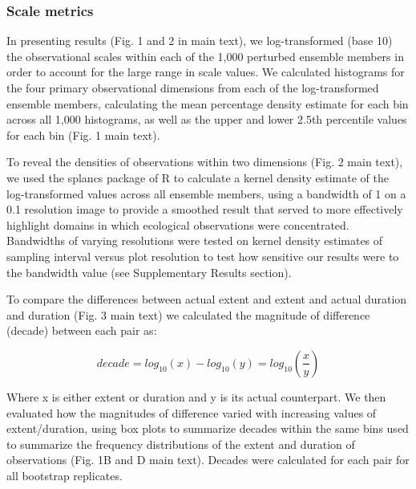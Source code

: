 \documentclass[12pt]{article}
\begin{document}
\subsubsection*{Scale metrics}
\vspace{-10pt}
In presenting results (Fig. 1 and 2 in main text), we log-transformed (base 10) the observational scales within each of the 1,000 perturbed ensemble members in order to account for the large range in scale values. We calculated histograms for the four primary observational dimensions from each of the log-transformed ensemble members, calculating the mean percentage density estimate for each bin across all 1,000 histograms, as well as the upper and lower 2.5th percentile values for each bin (Fig. 1 main text).  

To reveal the densities of observations within two dimensions (Fig. 2 main text), we used the splancs package \cite{rowlingson_splancs:_1993} of R \cite{r_development_core_team_r:_2011} to calculate a kernel density estimate of the log-transformed values across all ensemble members, using a bandwidth of 1 on a 0.1 resolution image to provide a smoothed result that served to more effectively highlight domains in which ecological observations were concentrated. Bandwidths of varying resolutions were tested on kernel density estimates of sampling interval versus plot resolution to test how sensitive our results were to the bandwidth value (see Supplementary Results section).  

To compare the differences between actual extent and extent and actual duration and duration (Fig. 3 main text) we calculated the magnitude of difference (decade) between each pair as:

\begin{equation}
decade = log_{10}(x) - log_{10}(y) = log_{10}\left(\frac{x}{y}\right)
\end{equation}

\noindent Where x is either extent or duration and y is its actual counterpart. We then evaluated how the magnitudes of difference varied with increasing values of extent/duration, using box plots to summarize decades within the same bins used to summarize the frequency distributions of the extent and duration of observations (Fig. 1B and D main text). Decades were calculated for each pair for all bootstrap replicates. 
\end{document}
